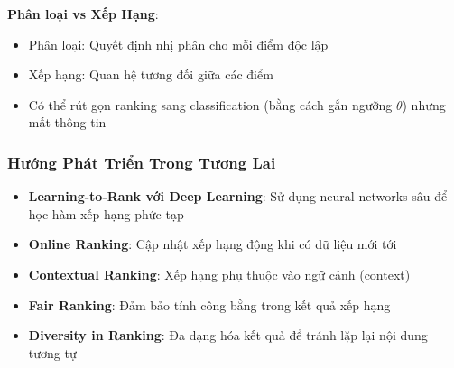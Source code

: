 \textbf{Phân loại vs Xếp Hạng}:
\begin{itemize}
    \item Phân loại: Quyết định nhị phân cho mỗi điểm độc lập
    \item Xếp hạng: Quan hệ tương đối giữa các điểm
    \item Có thể rút gọn ranking sang classification (bằng cách gắn ngưỡng $\theta$) nhưng mất thông tin
\end{itemize}

\subsubsection{Hướng Phát Triển Trong Tương Lai}

\begin{itemize}
    \item \textbf{Learning-to-Rank với Deep Learning}: Sử dụng neural networks sâu để học hàm xếp hạng phức tạp
    \item \textbf{Online Ranking}: Cập nhật xếp hạng động khi có dữ liệu mới tới
    \item \textbf{Contextual Ranking}: Xếp hạng phụ thuộc vào ngữ cảnh (context)
    \item \textbf{Fair Ranking}: Đảm bảo tính công bằng trong kết quả xếp hạng
    \item \textbf{Diversity in Ranking}: Đa dạng hóa kết quả để tránh lặp lại nội dung tương tự
\end{itemize}

\vspace{1cm}